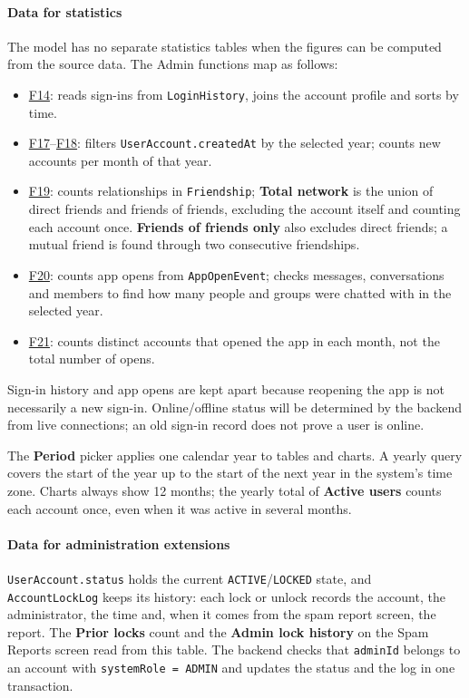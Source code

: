\paragraph{Data for statistics}
\mbox{}\par

The model has no separate statistics tables when the figures can be computed from
the source data. The Admin functions map as follows:

\begin{itemize}
  \item \hyperlink{F14}{F14}: reads sign-ins from
    \texttt{LoginHistory}, joins the account profile and sorts by time.
  \item \hyperlink{F17}{F17}--\hyperlink{F18}{F18}: filters
    \texttt{UserAccount.createdAt} by the selected year; counts new accounts
    per month of that year.
  \item \hyperlink{F19}{F19}: counts relationships in \texttt{Friendship};
    \textbf{Total network} is the union of direct friends and friends of friends,
    excluding the account itself and counting each account once.
    \textbf{Friends of friends only} also excludes direct friends; a mutual friend
    is found through two consecutive friendships.
  \item \hyperlink{F20}{F20}: counts app opens from
    \texttt{AppOpenEvent}; checks messages, conversations and members to find
    how many people and groups were chatted with in the selected year.
  \item \hyperlink{F21}{F21}: counts distinct accounts that opened the app in
    each month, not the total number of opens.
\end{itemize}

Sign-in history and app opens are kept apart because reopening the app is not
necessarily a new sign-in. Online/offline status will be determined by the backend
from live connections; an old sign-in record does not prove a user is online.

The \textbf{Period} picker applies one calendar year to tables and charts.
A yearly query covers the start of the year up to the start of the next year in the
system's time zone. Charts always show 12 months; the yearly total of
\textbf{Active users} counts each account once, even when it was active in several
months.

\paragraph{Data for administration extensions}
\mbox{}\par
\texttt{UserAccount.status} holds the current \texttt{ACTIVE}/\texttt{LOCKED}
state, and \texttt{AccountLockLog} keeps its history: each lock or unlock records
the account, the administrator, the time and, when it comes from the spam report
screen, the report. The \textbf{Prior locks} count and the \textbf{Admin lock
history} on the Spam Reports screen read from this table. The backend checks that
\texttt{adminId} belongs to an account with \texttt{systemRole = ADMIN} and
updates the status and the log in one transaction.

